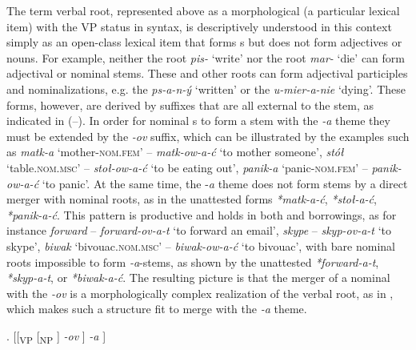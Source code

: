 The term verbal root, represented above as a morphological  (a particular lexical item) with the VP status in syntax, is descriptively understood in this context simply as an open-class lexical item that forms s but does not form adjectives or nouns.
For example, neither the  root \textit{pis-} `write' nor the  root \textit{mar-} `die' can form adjectival or nominal stems. These and other roots can form adjectival participles and nominalizations, e.g. the  \textit{ps-a-n-\'y} `written' or the  \textit{u-mier-a-nie} `dying'. These forms, however, are derived by suffixes that are all external to the  stem, as indicated in (--). 
In order for nominal s to form a  stem with the \textit{-a} theme they must be extended by the \textit{-ov} suffix, which can be illustrated by the  examples such as \textit{matk-a} `mother-\textsc{nom.fem}' -- \textit{matk-ow-a-\'c} `to mother someone', \textit{st\'o\l} {} `table.\textsc{nom.msc}' -- \textit{sto\l-ow-a-\'c} `to be eating out', \textit{panik-a} `panic-\textsc{nom.fem}' -- \textit{panik-ow-a-\'c} `to panic'. At the same time, the -\textit{a} theme does not form  stems by a direct merger with nominal roots, as in the unattested forms \textit{*matk-a-\'c}, \textit{*sto\l-a-\'c}, \textit{*panik-a-\'c}.  This pattern is productive and holds in both  and  borrowings, as for instance \textit{forward} -- \textit{forward-ov-a-t} `to forward an email', \textit{skype} -- \textit{skyp-ov-a-t} `to skype', \textit{biwak} `bivouac.\textsc{nom.msc}' -- \textit{biwak-ow-a-\'c} `to bivouac', with bare nominal roots impossible to form \textit{-a}-stems, as shown by the unattested \textit{*forward-a-t}, \textit{*skyp-a-t}, or \textit{*biwak-a-\'c}. 
The resulting picture is that the merger of a nominal  with the \textit{-ov} is a morphologically complex realization of the verbal root, as in \Next, which makes such a structure fit to merge with the \textit{-a} theme. 

\ex. [[\textsubscript{VP} [\textsubscript{NP}  ] \textit{-ov} ] \textit{-a} ]

